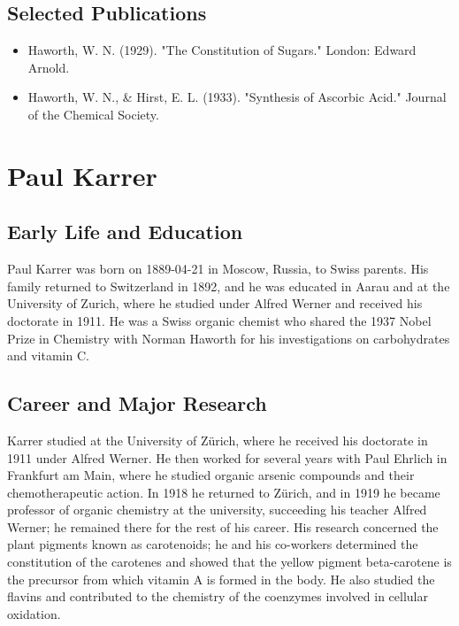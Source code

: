 \subsection*{Selected Publications}

\begin{itemize}

\item Haworth, W. N. (1929). "The Constitution of Sugars." London: Edward Arnold.

\item Haworth, W. N., \& Hirst, E. L. (1933). "Synthesis of Ascorbic Acid." Journal of the Chemical Society.

\end{itemize}

\clearpage

\section{Paul Karrer}

\subsection*{Early Life and Education}

Paul Karrer was born on 1889-04-21 in Moscow, Russia, to Swiss parents. His family returned to Switzerland in 1892, and he was educated in Aarau and at the University of Zurich, where he studied under Alfred Werner and received his doctorate in 1911.
He was a Swiss organic chemist who shared the 1937 Nobel Prize in Chemistry with Norman Haworth for his investigations on carbohydrates and vitamin C.

\subsection*{Career and Major Research}

Karrer studied at the University of Zürich, where he received his doctorate in 1911 under Alfred Werner.
He then worked for several years with Paul Ehrlich in Frankfurt am Main, where he studied organic arsenic compounds and their chemotherapeutic action.
In 1918 he returned to Zürich, and in 1919 he became professor of organic chemistry at the university, succeeding his teacher Alfred Werner; he remained there for the rest of his career.
His research concerned the plant pigments known as carotenoids; he and his co-workers determined the constitution of the carotenes and showed that the yellow pigment beta-carotene is the precursor from which vitamin A is formed in the body.
He also studied the flavins and contributed to the chemistry of the coenzymes involved in cellular oxidation.

